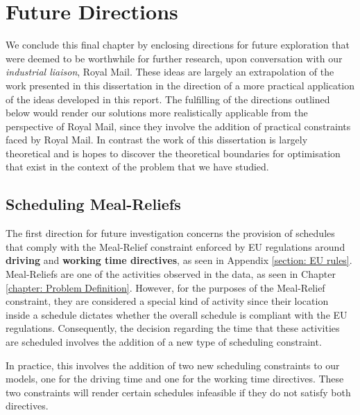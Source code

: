 \section{Future Directions}
We conclude this final chapter by enclosing directions for future exploration that were deemed to be worthwhile for further research, upon conversation with our \textit{industrial liaison}, Royal Mail. These ideas are largely an extrapolation of the work presented in this dissertation in the direction of a more practical application of the ideas developed in this report. The fulfilling of the directions outlined below would render our solutions more realistically applicable from the perspective of Royal Mail, since they involve the addition of practical constraints faced by Royal Mail. In contrast the work of this dissertation is largely theoretical and is hopes to discover the theoretical boundaries for optimisation that exist in the context of the problem that we have studied. 

\subsection*{Scheduling Meal-Reliefs}
\label{section: Addition of the Meal Relief Constraint}
The first direction for future investigation concerns the provision of schedules that comply with the Meal-Relief constraint enforced by EU regulations around \textbf{driving} and \textbf{working time directives}, as seen in Appendix \ref{section: EU rules}. Meal-Reliefs are one of the activities observed in the data, as seen in Chapter \ref{chapter: Problem Definition}. However, for the purposes of the Meal-Relief constraint, they are considered a special kind of activity since their location inside a schedule dictates whether the overall schedule is compliant with the EU regulations. Consequently, the decision regarding the time that these activities are scheduled involves the addition of a new type of scheduling constraint. 

\vspace{\baselineskip}
\noindent
In practice, this involves the addition of two new scheduling constraints to our models, one for the driving time and one for the working time directives. These two constraints will render certain schedules infeasible if they do not satisfy both directives. 

